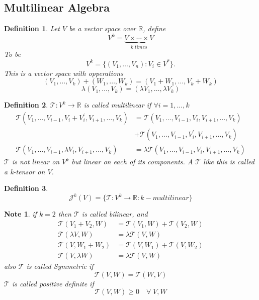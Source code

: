 \documentclass[12pt]{article}
\def\RR{\mathbb{R}}
\newtheorem{definition}{Definition}[section]
\newtheorem*{note}{Note}
\begin{document}
\subsection{Multilinear Algebra}
\begin{definition}
Let $V$ be a vector space over $\RR$, define
\[V^k = \underbrace{V \times \cdots \times V}_{k \; times }\]
To be
\[V^k = \{(V_1, \dots, V_n) : V_i \in V^* \}.\]
This is a vector space with opperations 
\[(V_1, \dots , V_k) + (W_1, \dots , W_k) = (V_1 + W_1, \dots , V_k + W_k)\]
\[\lambda(V_1 , \dots , V_k) = (\lambda V_1 , \dots , \lambda V_k) \]
\end{definition}

\begin{definition}
$\mathcal{T}:V^k \rightarrow \RR$ is called multilinear if $\forall i = 1, \dots , k$
\begin{align*}
\mathcal{T}(V_1, \dots , V_{i-1},V_i +V_i^{'}, V_{i+1}, \dots , V_k) &= \mathcal{T}(V_1, \dots , V_{i-1},V_i , V_{i+1}, \dots , V_k)\\ &+ \mathcal{T}(V_1, \dots , V_{i-1},V_i^{'}, V_{i+1}, \dots , V_k)\\
\mathcal{T}(V_1, \dots , V_{i-1},\lambda V_i , V_{i+1}, \dots , V_k) &= \lambda\mathcal{T}(V_1, \dots , V_{i-1},V_i , V_{i+1}, \dots , V_k)\end{align*}
$\mathcal{T}$ is not linear on $V^k$ but linear on each of its components. A $\mathcal{T}$ like this is called a k-tensor on $V$.
\end{definition}

\begin{definition}
\[\mathcal{J}^k(V) = \{\mathcal{T}:V^k \rightarrow \RR : k-multilinear\}\]
\end{definition}

\begin{note} if $k=2$ then $\mathcal{T}$ is called bilinear, and
\begin{align*}
\mathcal{T}(V_1 + V_2 , W) &= \mathcal{T}(V_1, W)+ \mathcal{T}(V_2, W)\\
\mathcal{T}(\lambda V, W) & = \lambda\mathcal{T}(V, W)\\
\mathcal{T}(V,W_1 + W_2) &= \mathcal{T}(V, W_1)+ \mathcal{T}(V, W_2)\\
\mathcal{T}(V, \lambda W)  & = \lambda\mathcal{T}(V, W)
\end{align*}
also
$\mathcal{T}$ is called Symmetric if \[\mathcal{T}(V,W) =  \mathcal{T}(W,V)\]
$\mathcal{T}$ is called positive definite if \[\mathcal{T}(V,W)\geq 0 \quad \forall \; V,W\]
 \end{note}
\end{document}
